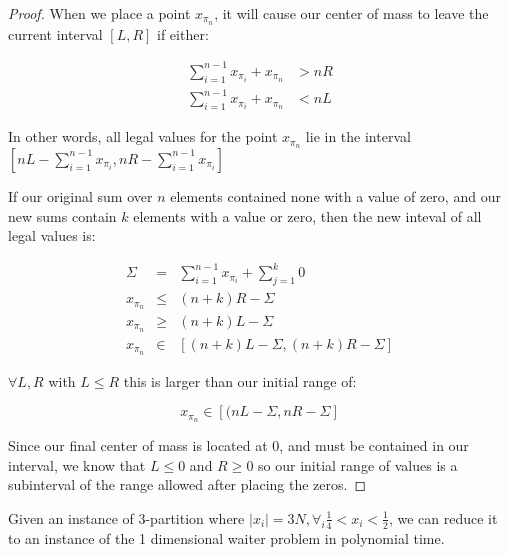 \begin{proof}
When we place a point $x_{\pi_n}$, it will cause our center of mass to leave the current interval $[L, R]$ if either:

\begin{align*} 
\sum_{i=1}^{n-1} x_{\pi_i} + x_{\pi_n} &> n R \\
\sum_{i=1}^{n-1} x_{\pi_i} + x_{\pi_n} &< n L
\end{align*}

In other words, all legal values for the point $x_{\pi_n}$ lie in the interval $[ n L - \sum_{i=1}^{n-1} x_{\pi_i}, n R - \sum_{i=1}^{n-1} x_{\pi_i}] $

If our original sum over $n$ elements contained none with a value of zero, and our new sums contain $k$ elements with a value or zero, then the new inteval of all legal values is:

\begin{eqnarray*}
\Sigma &=& \sum_{i=1}^{n-1} x_{\pi_i} + \sum_{j=1}^k 0 \\
x_{\pi_n} &\leq& (n+k) R - \Sigma \\
x_{\pi_n} &\geq& (n+k) L - \Sigma \\
x_{\pi_n} &\in& [ (n+k) L - \Sigma, (n+k) R - \Sigma ]
\end{eqnarray*}

$\forall L, R$ with $L \leq R$ this is larger than our initial range of:

\begin{equation*}
x_{\pi_n} \in [ (n L - \Sigma, n R - \Sigma ]
\end{equation*}

Since our final center of mass is located at 0, and must be contained in our interval, we know that $L\leq 0$ and $R\geq 0$ so our initial range of values is a subinterval of the range allowed after placing the zeros.
\end{proof}

\begin{thm}\label{thm:completeness}
Given an instance of 3-partition where $ |x_i| = 3N, \forall_i \frac{1}{4} < x_i < \frac{1}{2} $, we can reduce it to an instance of the 1 dimensional waiter problem in polynomial time.  
\end{thm}

